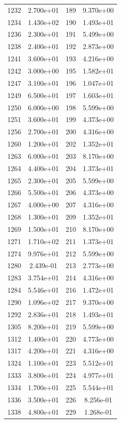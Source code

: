 \documentclass[12pt]{article}
\begin{document}
\begin{longtable}{@{}cccc@{}}
1232 & 2.700e+01 & 189 & 9.370e+00 \\
1234 & 1.430e+02 & 190 & 1.493e+01 \\
1236 & 2.300e+01 & 191 & 5.499e+00 \\
1238 & 2.400e+01 & 192 & 2.873e+00 \\
1241 & 3.600e+01 & 193 & 4.216e+00 \\
1242 & 3.000e+00 & 195 & 1.582e+01 \\
1247 & 3.100e+01 & 196 & 1.047e+01 \\
1249 & 6.500e+01 & 197 & 1.603e+01 \\
1250 & 6.000e+00 & 198 & 5.599e+00 \\
1251 & 3.600e+01 & 199 & 4.373e+00 \\
1256 & 2.700e+01 & 200 & 4.316e+00 \\
1260 & 1.200e+01 & 202 & 1.352e+01 \\
1263 & 6.000e+01 & 203 & 8.170e+00 \\
1264 & 4.400e+01 & 204 & 1.373e+01 \\
1265 & 2.300e+01 & 205 & 5.599e+00 \\
1266 & 5.500e+01 & 206 & 4.373e+00 \\
1267 & 4.000e+00 & 207 & 4.316e+00 \\
1268 & 1.300e+01 & 209 & 1.352e+01 \\
1269 & 1.500e+01 & 210 & 8.170e+00 \\
1271 & 1.710e+02 & 211 & 1.373e+01 \\
1274 & 9.976e+01 & 212 & 5.599e+00 \\
1280 & 2.439e-01 & 213 & 2.773e+00 \\
1283 & 3.754e+01 & 214 & 4.316e+00 \\
1284 & 5.546e+01 & 216 & 1.472e+01 \\
1290 & 1.096e+02 & 217 & 9.370e+00 \\
1292 & 2.836e+01 & 218 & 1.493e+01 \\
1305 & 8.200e+01 & 219 & 5.599e+00 \\
1312 & 1.400e+01 & 220 & 4.773e+00 \\
1317 & 4.200e+01 & 221 & 4.316e+00 \\
1324 & 1.100e+01 & 223 & 5.512e+01 \\
1333 & 3.800e+01 & 224 & 4.977e+01 \\
1334 & 1.700e+01 & 225 & 5.544e+01 \\
1336 & 3.500e+01 & 226 & 8.256e-01 \\
1338 & 4.800e+01 & 229 & 1.268e-01 \\

\end{longtable}
\end{document}
